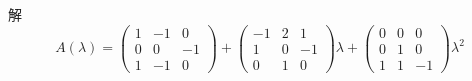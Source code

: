 解
$$
A(\lambda)=
\begin{pmatrix}
1 & -1 & 0 \\
0 & 0  & -1\\
1 & -1 & 0
\end{pmatrix}
+\begin{pmatrix}
-1 & 2 & 1 \\
1 & 0  & -1\\
0 & 1 & 0
\end{pmatrix}
\lambda
+\begin{pmatrix}
0 & 0 & 0 \\
0 & 1 & 0\\
1 & 1 & -1
\end{pmatrix}\lambda^2
$$

